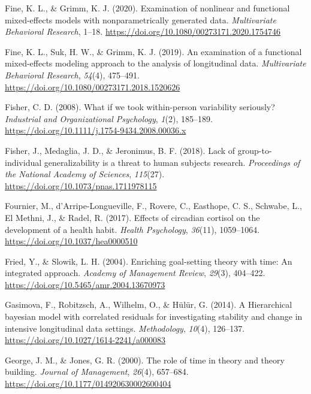 \documentclass[
  english,
  man,floatsintext]{apa7}
\newlength{\cslhangindent}
\newlength{\cslentryspacingunit} %
\newenvironment{CSLReferences}[2] %
 {%
  \setlength{\parindent}{0pt}
  \ifodd #1
  \let\oldpar\par
  \def\par{\hangindent=\cslhangindent\oldpar}
  \fi
  \setlength{\parskip}{#2\cslentryspacingunit}
 }%
 {}
\begin{document}
\begin{CSLReferences}{1}{0}
\leavevmode{}%
Fine, K. L., \& Grimm, K. J. (2020). Examination of nonlinear and functional mixed-effects models with nonparametrically generated data. \emph{Multivariate Behavioral Research}, 1--18. \url{https://doi.org/10.1080/00273171.2020.1754746}

\leavevmode{}%
Fine, K. L., Suk, H. W., \& Grimm, K. J. (2019). An examination of a functional mixed-effects modeling approach to the analysis of longitudinal data. \emph{Multivariate Behavioral Research}, \emph{54}(4), 475--491. \url{https://doi.org/10.1080/00273171.2018.1520626}

\leavevmode{}%
Fisher, C. D. (2008). What if we took within-person variability seriously? \emph{Industrial and Organizational Psychology}, \emph{1}(2), 185--189. \url{https://doi.org/10.1111/j.1754-9434.2008.00036.x}

\leavevmode{}%
Fisher, J., Medaglia, J. D., \& Jeronimus, B. F. (2018). Lack of group-to-individual generalizability is a threat to human subjects research. \emph{Proceedings of the National Academy of Sciences}, \emph{115}(27). \url{https://doi.org/10.1073/pnas.1711978115}

\leavevmode{}%
Fournier, M., d'Arripe-Longueville, F., Rovere, C., Easthope, C. S., Schwabe, L., El Methni, J., \& Radel, R. (2017). Effects of circadian cortisol on the development of a health habit. \emph{Health Psychology}, \emph{36}(11), 1059--1064. \url{https://doi.org/10.1037/hea0000510}

\leavevmode{}%
Fried, Y., \& Slowik, L. H. (2004). Enriching goal-setting theory with time: An integrated approach. \emph{Academy of Management Review}, \emph{29}(3), 404--422. \url{https://doi.org/10.5465/amr.2004.13670973}

\leavevmode{}%
Gasimova, F., Robitzsch, A., Wilhelm, O., \& Hülür, G. (2014). A Hierarchical bayesian model with correlated residuals for investigating stability and change in intensive longitudinal data settings. \emph{Methodology}, \emph{10}(4), 126--137. \url{https://doi.org/10.1027/1614-2241/a000083}

\leavevmode{}%
George, J. M., \& Jones, G. R. (2000). The role of time in theory and theory building. \emph{Journal of Management}, \emph{26}(4), 657--684. \url{https://doi.org/10.1177/014920630002600404}


\end{CSLReferences}
\end{document}
